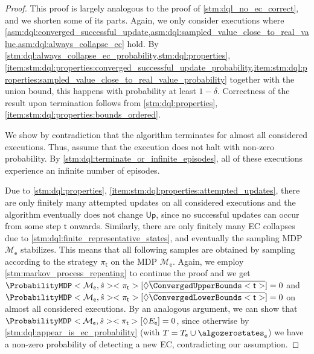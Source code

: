 \documentclass{article}
\newcommand{\unionSym}{\cup}
\newcommand{\unionBin}{\mathbin{\unionSym}}
\newcommand{\union}{\unionBin}
\newcommand{\MDP}{\mathcal{M}}
\newcommand{\initialstate}{\hat{s}}
\newcommand{\strategy}{\pi}
\newcommand{\reach}{\Diamond}
\newcommand{\upperbound}{\mathsf{Up}}
\newcommand{\targetset}{T}
\newcommand{\algostep}{\mathsf{t}}
\newcommand{\algoepisode}{\mathsf{e}}
\begin{document}
\begin{proof}
	This proof is largely analogous to the proof of \cref{stm:dql_no_ec_correct}, and we shorten some of its parts.
	Again, we only consider executions where \cref{asm:dql:converged_successful_update,asm:dql:sampled_value_close_to_real_value,asm:dql:always_collapse_ec} hold.
	By \cref{stm:dql:always_collapse_ec_probability,stm:dql:properties}, \cref{item:stm:dql:properties:converged_successful_update_probability,item:stm:dql:properties:sampled_value_close_to_real_value_probability} together with the union bound, this happens with probability at least $1 - \delta$.
	Correctness of the result upon termination follows from \cref{stm:dql:properties}, \cref{item:stm:dql:properties:bounds_ordered}.

	We show by contradiction that the algorithm terminates for almost all considered executions.
	Thus, assume that the execution does not halt with non-zero probability.
	By \cref{stm:dql:terminate_or_infinite_episodes}, all of these executions experience an infinite number of episodes.

	Due to \cref{stm:dql:properties}, \cref{item:stm:dql:properties:attempted_updates}, there are only finitely many attempted updates on all considered executions and the algorithm eventually does not change $\upperbound$, since no successful updates can occur from some step $\algostep$ onwards.
	Similarly, there are only finitely many EC collapses due to \cref{stm:dql:finite_representative_states}, and eventually the sampling MDP $\MDP_\algoepisode$ stabilizes.
	This means that all following samples are obtained by sampling according to the strategy $\strategy_\algostep$ on the MDP $\MDP_\algoepisode$.
	Again, we employ \cref{stm:markov_process_repeating} to continue the proof and we get $\ProbabilityMDP<\MDP_\algoepisode, \initialstate><\strategy_\algostep>[\reach \overline{\ConvergedUpperBounds<\algostep>}] = 0$ and $\ProbabilityMDP<\MDP_\algoepisode, \initialstate><\strategy_\algostep>[\reach \overline{\ConvergedLowerBounds<\algostep>}] = 0$ on almost all considered executions.
	By an analogous argument, we can show that $\ProbabilityMDP<\MDP_\algoepisode, \initialstate><\strategy_\algostep>[\reach E_\algoepisode] = 0$, since otherwise by \cref{stm:dql:appear_is_ec_probability} (with $\targetset = \targetset_\algoepisode \union \algozerostates_\algoepisode$) we have a non-zero probability of detecting a new EC, contradicting our assumption.


\end{proof}
\end{document}
